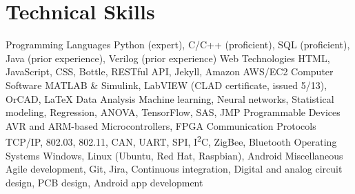 \section{Technical Skills}
\begin{cvskills}
  \cvskill
    {Programming Languages}
    {Python (expert), C/C++ (proficient), SQL (proficient), Java (prior experience), Verilog (prior experience)}
  \cvskill
    {Web Technologies}
    {HTML, JavaScript, CSS, Bottle, RESTful API, Jekyll, Amazon AWS/EC2}
  \cvskill
    {Computer Software}
    {MATLAB \& Simulink, LabVIEW (CLAD certificate, issued 5/13), OrCAD, LaTeX}
  \cvskill
    {Data Analysis}
    {Machine learning, Neural networks, Statistical modeling, Regression, ANOVA, TensorFlow, SAS, JMP}
  \cvskill
    {Programmable Devices}
    {AVR and ARM-based Microcontrollers, FPGA}
  \cvskill
    {Communication Protocols}
    {TCP/IP, 802.03, 802.11, CAN, UART, SPI, I\textsuperscript{2}C, ZigBee, Bluetooth}
  \cvskill
    {Operating Systems}
    {Windows, Linux (Ubuntu, Red Hat, Raspbian), Android}
  \cvskill
    {Miscellaneous}
    {Agile development, Git, Jira, Continuous integration, Digital and analog circuit design, PCB design, Android app development}
\end{cvskills} 